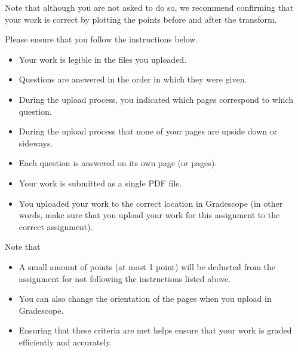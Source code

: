 \documentclass[11pt]{exam}
\begin{document}
\begin{questions}
    Note that although you are not asked to do so, we recommend confirming that your work is correct by plotting the points before and after the transform. 
\end{questions}


\noindent Please ensure that you follow the instructions below. 
\begin{itemize}
    \item Your work is legible in the files you uploaded. 
    \item Questions are answered in the order in which they were given. 
    \item During the upload process, you indicated which pages correspond to which question.
    \item During the upload process that none of your pages are upside down or sideways. 
    \item Each question is answered on its own page (or pages). 
    \item Your work is submitted as a single PDF file.
    \item You uploaded your work to the correct location in Gradescope (in other words, make sure that you upload your work for this assignment to the correct assignment).
\end{itemize}
\noindent Note that
\begin{itemize}
    \item A small amount of points (at most 1 point) will be deducted from the assignment for not following the instructions listed above. 
    \item You can also change the orientation of the pages when you upload in Gradescope. 
    \item Ensuring that these criteria are met helps ensure that your work is graded efficiently and accurately. 
\end{itemize}
\end{document}
